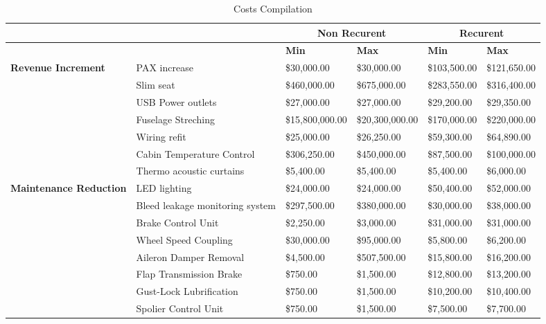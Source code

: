 \begin{table}[H]
  \tiny
  \centering
  \caption{Costs Compilation}
    \begin{tabular}{| p{3cm} | p{4cm} | l | l | l | l |}
    \toprule
          &       & \multicolumn{2}{c}{\textbf{Non Recurent}} & \multicolumn{2}{c}{\textbf{Recurent}} \\
    \midrule
          &       & \textbf{Min} & \textbf{Max} & \textbf{Min} & \textbf{Max} \\
    \multirow{7}[14]{*}{\textbf{Revenue Increment}} & PAX increase & \$30,000.00 & \$30,000.00 & \$103,500.00 & \$121,650.00 \\
          & Slim seat & \$460,000.00 & \$675,000.00 & \$283,550.00 & \$316,400.00 \\
          & USB Power outlets & \$27,000.00 & \$27,000.00 & \$29,200.00 & \$29,350.00 \\
          & Fuselage Streching & \$15,800,000.00 & \$20,300,000.00 & \$170,000.00 & \$220,000.00 \\
          & Wiring refit & \$25,000.00 & \$26,250.00 & \$59,300.00 & \$64,890.00 \\
          & Cabin Temperature Control & \$306,250.00 & \$450,000.00 & \$87,500.00 & \$100,000.00 \\
          & Thermo acoustic curtains & \$5,400.00 & \$5,400.00 & \$5,400.00 & \$6,000.00 \\
    \multirow{14}[28]{*}{ \textbf{Maintenance Reduction}} & LED lighting & \$24,000.00 & \$24,000.00 & \$50,400.00 & \$52,000.00 \\
          & Bleed leakage monitoring system & \$297,500.00 & \$380,000.00 & \$30,000.00 & \$38,000.00 \\
          & Brake Control Unit & \$2,250.00 & \$3,000.00 & \$31,000.00 & \$31,000.00 \\
          & Wheel Speed Coupling & \$30,000.00 & \$95,000.00 & \$5,800.00 & \$6,200.00 \\
          & Aileron Damper Removal & \$4,500.00 & \$507,500.00 & \$15,800.00 & \$16,200.00 \\
          & Flap Transmission Brake & \$750.00 & \$1,500.00 & \$12,800.00 & \$13,200.00 \\
          & Gust-Lock Lubrification & \$750.00 & \$1,500.00 & \$10,200.00 & \$10,400.00 \\
          & Spolier Control Unit & \$750.00 & \$1,500.00 & \$7,500.00 & \$7,700.00 \\

\end{tabular}
\end{table}
